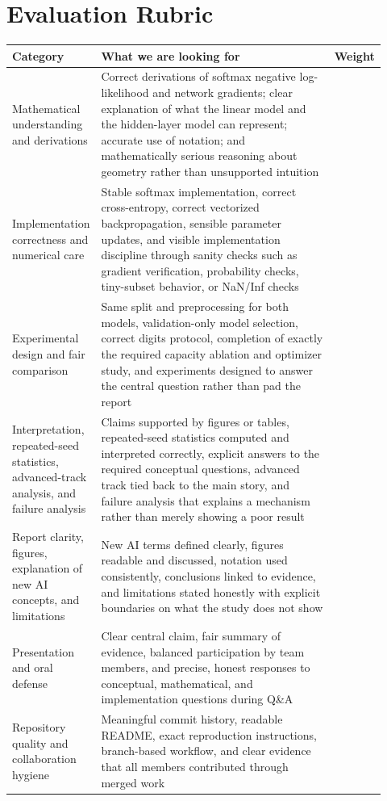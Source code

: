 \documentclass[11pt]{article}
\begin{document}
\section{Evaluation Rubric}

\begin{tabularx}{\linewidth}{>{\raggedright\arraybackslash}p{0.14\linewidth} >{\raggedright\arraybackslash}p{0.66\linewidth} >{\raggedleft\arraybackslash}p{0.12\linewidth}}
\toprule
\textbf{Category} & \textbf{What we are looking for} & \textbf{Weight} \\
\midrule
Mathematical understanding and derivations & Correct derivations of softmax negative log-likelihood and network gradients; clear explanation of what the linear model and the hidden-layer model can represent; accurate use of notation; and mathematically serious reasoning about geometry rather than unsupported intuition & 20 \\
Implementation correctness and numerical care & Stable softmax implementation, correct cross-entropy, correct vectorized backpropagation, sensible parameter updates, and visible implementation discipline through sanity checks such as gradient verification, probability checks, tiny-subset behavior, or NaN/Inf checks & 16 \\
Experimental design and fair comparison & Same split and preprocessing for both models, validation-only model selection, correct digits protocol, completion of exactly the required capacity ablation and optimizer study, and experiments designed to answer the central question rather than pad the report & 18 \\
Interpretation, repeated-seed statistics, advanced-track analysis, and failure analysis & Claims supported by figures or tables, repeated-seed statistics computed and interpreted correctly, explicit answers to the required conceptual questions, advanced track tied back to the main story, and failure analysis that explains a mechanism rather than merely showing a poor result & 18 \\
Report clarity, figures, explanation of new AI concepts, and limitations & New AI terms defined clearly, figures readable and discussed, notation used consistently, conclusions linked to evidence, and limitations stated honestly with explicit boundaries on what the study does not show & 10 \\
Presentation and oral defense & Clear central claim, fair summary of evidence, balanced participation by team members, and precise, honest responses to conceptual, mathematical, and implementation questions during Q\&A & 10 \\
Repository quality and collaboration hygiene & Meaningful commit history, readable README, exact reproduction instructions, branch-based workflow, and clear evidence that all members contributed through merged work & 8 \\
\bottomrule
\end{tabularx}
\end{document}
